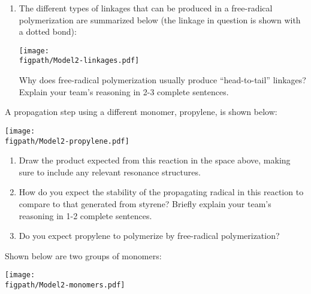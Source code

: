 \begin{activity}
\begin{ctqs}
\begin{enumerate}
			\item The different types of linkages that can be produced in a free-radical polymerization are summarized below (the linkage in question is shown with a dotted bond):
	
			\centerline{\texttt{[image: \\figpath/Model2-linkages.pdf]}}
			
				Why does free-radical polymerization usually produce ``head-to-tail'' linkages?  Explain your team's reasoning in 2-3 complete sentences.
				
				\begin{solution}[2in]
				\end{solution}
			
		\end{enumerate}
		
	\question A propagation step using a different monomer, propylene, is shown below:
	
		\vspace{6pt}
			\texttt{[image: \\figpath/Model2-propylene.pdf]}
		\vspace{6pt}
	
		\begin{enumerate}
		
			\item Draw the product expected from this reaction in the space above, making sure to include any relevant resonance structures.
		\vspace{12pt}
			
			\item How do you expect the stability of the propagating radical in this reaction to compare to that generated from styrene?  Briefly explain your team's reasoning in 1-2 complete sentences.
			
				\begin{solution}[1.25in]
				\end{solution}
			
			\item Do you expect propylene to polymerize by free-radical polymerization?
			
				\begin{solution}[0.5in]
				\end{solution}
			
		\end{enumerate}
		
	\question Shown below are two groups of monomers:
	
			\centerline{\texttt{[image: \\figpath/Model2-monomers.pdf]}}
			

\end{ctqs}
\end{activity}
